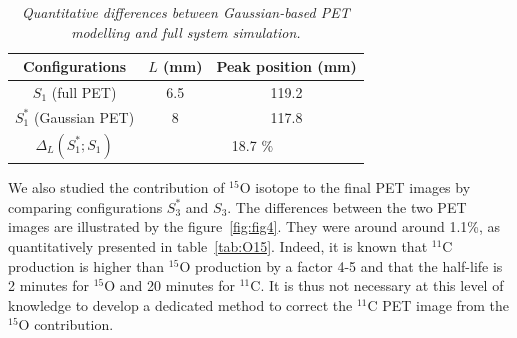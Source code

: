 \documentclass[11pt]{iopart}
\begin{document}
\begin{table}[htbp]
  \begin{center}
    \begin{tabular}{|c|c|c|} \hline
      Configurations                & $L$ (mm)          & Peak position (mm)    \\\hline
      $S_{1}$  (full PET)                     & 6.5                  &  119.2            \\ \hline 
      $S_{1}^{*}$  (Gaussian PET)                 & 8                    &  117.8         \\ \hline 
      $\Delta_{L}(S_{1}^{*};S_{1})$         &         \multicolumn{2}{c|}{18.7 $\%$}    \\ \hline\hline
    \end{tabular}
  \end{center} 
  \caption{\it Quantitative differences between Gaussian-based PET modelling
    and full system simulation.}
  \label{tab:gauss}
\end{table}

We also studied the contribution of $^{15}$O isotope to the final PET
images by comparing configurations $S_{3}^{*}$ and $S_{3}$. The
differences between the two PET images are illustrated by the
figure~\ref{fig:fig4}. They were around around 1.1\%, as
quantitatively presented in table~\ref{tab:O15}. Indeed, it is known
that $^{11}$C production is higher than $^{15}$O production by a
factor 4-5 and that the half-life is 2 minutes for $^{15}$O and 20
minutes for $^{11}$C. It is thus not necessary at this level of
knowledge to develop a dedicated method to correct the $^{11}$C PET
image from the $^{15}$O contribution.
\end{document}
